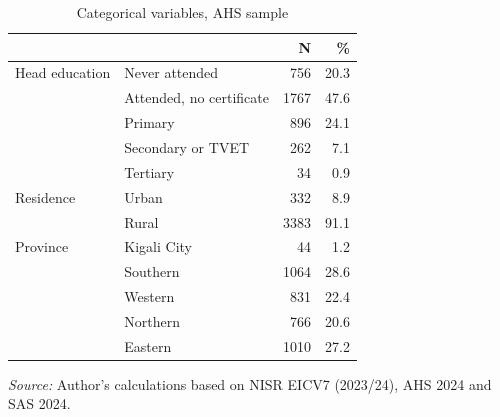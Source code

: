 \begin{table}[htbp]
\centering
\caption{Categorical variables, AHS sample}
\label{tab:table1_descriptives_categorical}
\footnotesize
\setlength{\tabcolsep}{4pt}
\centering
\begin{tabular}[t]{llrr}
\toprule
   &  & N & \%\\
\midrule
Head education & Never attended & 756 & 20.3\\
 & Attended, no certificate & 1767 & 47.6\\
 & Primary & 896 & 24.1\\
 & Secondary or TVET & 262 & 7.1\\
 & Tertiary & 34 & 0.9\\
Residence & Urban & 332 & 8.9\\
 & Rural & 3383 & 91.1\\
Province & Kigali City & 44 & 1.2\\
 & Southern & 1064 & 28.6\\
 & Western & 831 & 22.4\\
 & Northern & 766 & 20.6\\
 & Eastern & 1010 & 27.2\\
\bottomrule
\end{tabular}

\vspace{0.5em}
\begin{minipage}{\linewidth}
\footnotesize

\textit{Source:} Author's calculations based on NISR EICV7 (2023/24), AHS 2024 and SAS 2024.
\end{minipage}
\end{table}
